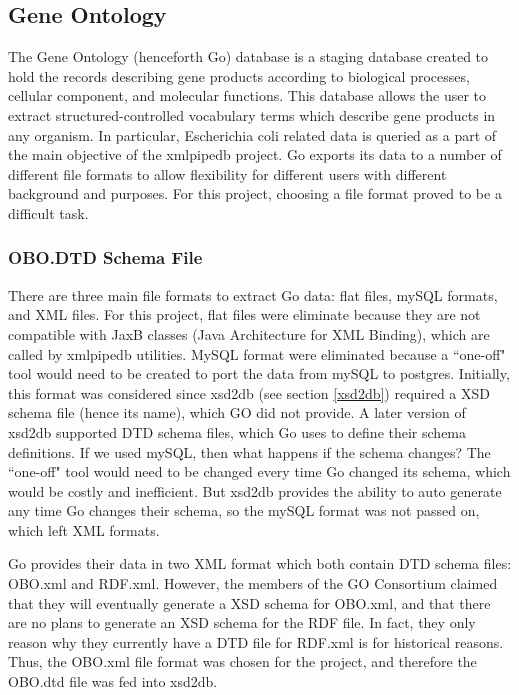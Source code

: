 %


\subsection{Gene Ontology}
The Gene Ontology (henceforth Go) database is a staging database created to hold the records describing gene products according to biological processes,
cellular component, and molecular functions. This database allows the user to extract structured-controlled vocabulary terms
which describe gene products in any organism. In particular, Escherichia coli related data is queried as a part of the main
objective of the xmlpipedb project. Go exports its data to a number of different file formats to allow flexibility for different users with
different background and purposes. For this project, choosing a file format proved to be a difficult task.

\subsubsection{OBO.DTD Schema File}
\label{godtd}
There are three main file formats to extract Go data: flat files, mySQL formats, and XML files. For this project,
flat files were eliminate because they are not compatible with JaxB classes (Java Architecture for XML Binding), which  are called by
xmlpipedb utilities. MySQL format were eliminated because a ``one-off" tool would need
to be created to port the data from mySQL to postgres. Initially, this format was considered since xsd2db
(see section \ref{xsd2db}) required a XSD
schema file (hence its name), which GO did not provide. A later version of xsd2db supported DTD schema files, which Go uses to define their
schema definitions. If we used mySQL, then what happens if the schema changes? The ``one-off" tool would need to be changed every
time Go changed its schema, which would be costly and inefficient. But xsd2db provides the ability to auto generate any time Go changes
their schema, so the mySQL format was not passed on, which left XML formats.

Go provides their data in two XML format which both contain DTD schema files: OBO.xml and RDF.xml. However,
the members of the GO Consortium claimed that they will eventually generate a XSD schema for OBO.xml, and that there
are no plans to generate an XSD schema for the RDF file. In fact, they only reason why they currently have a DTD file
for RDF.xml is for historical reasons. Thus, the OBO.xml file format
was chosen for the project, and therefore the OBO.dtd file was fed into xsd2db.


